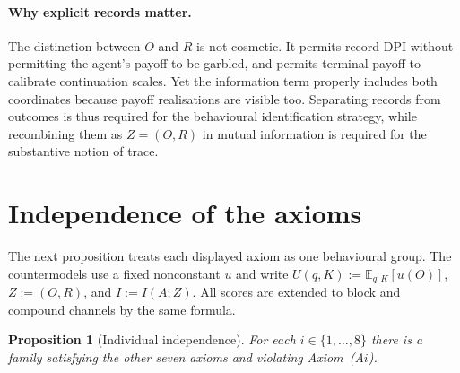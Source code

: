 \documentclass[11pt,a4paper]{article}
\newtheorem{proposition}[theorem]{Proposition}
\theoremstyle{definition}
\newcommand{\E}{\mathbb E}
\newcommand{\I}{I}
\newcommand{\1}{\mathbf 1}
\begin{document}
\paragraph{Why explicit records matter.}
The distinction between $O$ and $R$ is not cosmetic.  It permits record DPI without permitting the agent's payoff to be
garbled, and permits terminal payoff to calibrate continuation scales.  Yet the information term properly includes
both coordinates because payoff realisations are visible too.  Separating records from outcomes is thus required for
the behavioural identification strategy, while recombining them as $Z=(O,R)$ in mutual information is required for
the substantive notion of trace.

\section{Independence of the axioms}

The next proposition treats each displayed axiom as one behavioural group.  The countermodels use a fixed nonconstant
$u$ and write $U(q,K):=\E_{q,K}[u(O)]$, $Z:=(O,R)$, and $I:=\I(A;Z)$.  All scores are extended to block and compound
channels by the same formula.

\begin{proposition}[Individual independence]\label{prop:independence}
For each $i\in\{1,\ldots,8\}$ there is a family satisfying the other seven axioms and violating Axiom~\textup{(A$i$)}.
\end{proposition}
\end{document}
